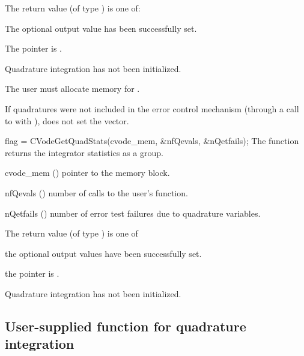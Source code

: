 {
  The return value  (of type ) is one of:
  \begin{args}
  \item[\Id{CV\_SUCCESS}] 
    The optional output value has been successfully set.
  \item[\Id{CV\_MEM\_NULL}]
    The  pointer is .
  \item[\Id{CV\_NO\_QUAD}]
    Quadrature integration has not been initialized.
  \end{args}
}
{
  {\warn}The user must allocate memory for .

  If quadratures were not included in the error control mechanism (through a 
  call to  with ), 
   does not set the  vector.
}
{
  flag = CVodeGetQuadStats(cvode\_mem, \&nfQevals, \&nQetfails);
}
{
  The function  returns the {\cvodes} integrator statistics
  as a group.
}
{
  \begin{args}
  \item[cvode\_mem] ()
    pointer to the {\cvodes} memory block.
  \item[nfQevals] ()
    number of calls to the user's  function.
  \item[nQetfails] ()
    number of error test failures due to quadrature variables.
  \end{args}
}
{
  The return value  (of type ) is one of
  \begin{args}
  \item[\Id{CV\_SUCCESS}] 
    the optional output values have been successfully set.
  \item[\Id{CV\_MEM\_NULL}]
    the  pointer is .
  \item[\Id{CV\_NO\_QUAD}]
    Quadrature integration has not been initialized.
  \end{args}
}
{}


\subsection{User-supplied function for quadrature integration}
\label{ss:user_fct_quad}

